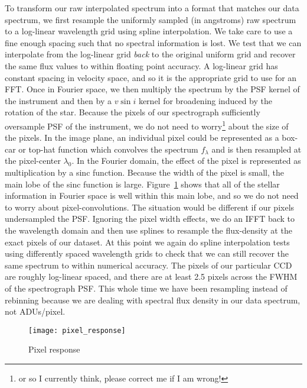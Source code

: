 \documentclass[preprint]{aastex} %
\begin{document}
To transform our raw interpolated spectrum into a format that matches our data spectrum, we first resample the uniformly sampled (in angstroms) raw spectrum to a log-linear wavelength grid using spline interpolation. We take care to use a fine enough spacing such that no spectral information is lost. We test that we can interpolate from the log-linear grid \emph{back} to the original uniform grid and recover the same flux values to within floating point accuracy. A log-linear grid has constant spacing in velocity space, and so it is the appropriate grid to use for an FFT. Once in Fourier space, we then multiply the spectrum by the PSF kernel of the instrument and then by a $v \sin i$ kernel for broadening induced by the rotation of the star. Because the pixels of our spectrograph sufficiently oversample PSF of the instrument, we do not need to worry\footnote{or so I currently think, please correct me if I am wrong!} about the size of the pixels. In the image plane, an individual pixel could be represented as a box-car or top-hat function which convolves the spectrum $f_\lambda$ and is then resampled at the pixel-center $\lambda_0$. In the Fourier domain, the effect of the pixel is represented as multiplication by a sinc function. Because the width of the pixel is small, the main lobe of the sinc function is large. Figure~\ref{fig:pixel_response} shows that all of the stellar information in Fourier space is well within this main lobe, and so we do not need to worry about pixel-convolutions. The situation would be different if our pixels undersampled the PSF. Ignoring the pixel width effects, we do an IFFT back to the wavelength domain and then use splines to resample the flux-density at the exact pixels of our dataset. At this point we again do spline interpolation tests using differently spaced wavelength grids to check that we can still recover the same spectrum to within numerical accuracy. The pixels of our particular CCD are roughly log-linear spaced, and there are at least 2.5 pixels across the FWHM of the spectrograph PSF. This whole time we have been resampling instead of rebinning because we are dealing with spectral flux density in our data spectrum, not ADUs/pixel.

\begin{figure}[!htb]
\begin{center}
  \texttt{[image: pixel\_response]}
\caption{Pixel response}
\label{fig:pixel_response}
\end{center}
\end{figure}
\end{document}
